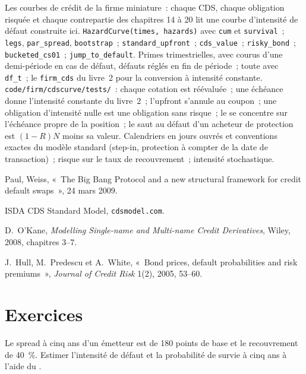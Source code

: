 \begin{build}
 Les courbes de crédit de la firme miniature~: chaque CDS, chaque obligation risquée
et chaque contrepartie des chapitres 14 à 20 lit une courbe d'intensité de défaut construite ici.
 \texttt{HazardCurve(times, hazards)} avec \texttt{cum} et
\texttt{survival}~; \texttt{legs}, \texttt{par\_spread}, \texttt{bootstrap}~;
\texttt{standard\_upfront}~; \texttt{cds\_value}~; \texttt{risky\_bond}~;
\texttt{bucketed\_cs01}~; \texttt{jump\_to\_default}.
 Primes trimestrielles, avec courus d'une demi-période en cas de défaut, défauts réglés en
fin de période~; toute  avec \texttt{df\_t}~; le \texttt{firm\_cds} du livre~2 pour la
conversion à intensité constante.
 \texttt{code/firm/cdscurve/tests/}~: chaque cotation est réévaluée~; une
échéance donne l'intensité constante du livre~2~; l'upfront s'annule au coupon~; une obligation
d'intensité nulle est une obligation sans risque~; le  se concentre sur l'échéance propre de la position~; le saut au défaut d'un
acheteur de protection est $(1-R)N$ moins sa valeur.
 Calendriers en jours ouvrés et conventions exactes du modèle standard
(step-in, protection à compter de la date de transaction)~; risque sur le taux de recouvrement~; intensité stochastique.
\end{build}

\begin{omsources}
\item Paul, Weiss, «~The Big Bang Protocol and a new structural framework for credit
default swaps~», 24 mars 2009.
\item ISDA CDS Standard Model, \texttt{cdsmodel.com}.
\item D.\ O'Kane, \emph{Modelling Single-name and Multi-name Credit Derivatives}, Wiley,
2008, chapitres 3--7.
\item J.\ Hull, M.\ Predescu et A.\ White, «~Bond prices, default probabilities and risk premiums~»,
\emph{Journal of Credit Risk} 1(2), 2005, 53--60.
\end{omsources}

\section{Exercices}

\begin{exercise}[$\star$]\label{exo:rc:reduced-form-credit:1}
Le spread à cinq ans d'un émetteur est de 180 points de base et le recouvrement de 40~\%. Estimer
l'intensité de défaut et la probabilité de survie à cinq ans à l'aide du .
\end{exercise}

